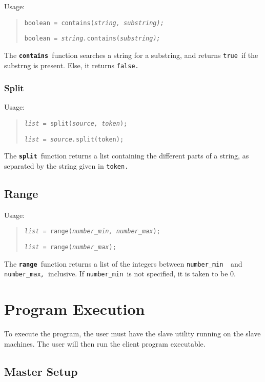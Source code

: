 \documentclass[oneside]{book}
\begin{document}
Usage:
\begin{quotation}
\texttt{boolean = contains(}\texttt{\emph{string, substring);}}

\texttt{boolean = }\texttt{\emph{string.}}\texttt{contains(}\texttt{\emph{substring);}}
\end{quotation}
The \texttt{\textbf{contains }}function searches a string for a substring,
and returns \texttt{true }if the substrng is present. Else, it returns
\texttt{false. }


\subsection{Split}

Usage:
\begin{quote}
\texttt{\emph{list = }}\texttt{split(}\texttt{\emph{source, token}}\texttt{);}

\texttt{\emph{list = source.}}\texttt{split(token);}
\end{quote}
The \texttt{\textbf{split }}function returns a list containing the
different parts of a string, as separated by the string given in \texttt{token. }


\section{Range}

Usage:
\begin{quote}
\texttt{\emph{list = }}\texttt{range(}\texttt{\emph{number\_min, number\_max}}\texttt{);}

\texttt{\emph{list = }}\texttt{range(}\texttt{\emph{number\_max}}\texttt{);}
\end{quote}
The \texttt{\textbf{range }}function returns a list of the integers
between \texttt{number\_min}\texttt{\emph{ }}and\texttt{\emph{ }}\texttt{number}\texttt{\emph{\_}}\texttt{max}\texttt{\emph{,
}}inclusive. If \texttt{number\_min }is not specified, it is taken
to be 0.

\chapter{Program Execution}
To execute the program, the user must have the slave utility running
on the slave machines. The user will then run the client program executable.


\section{Master Setup}
\end{document}
